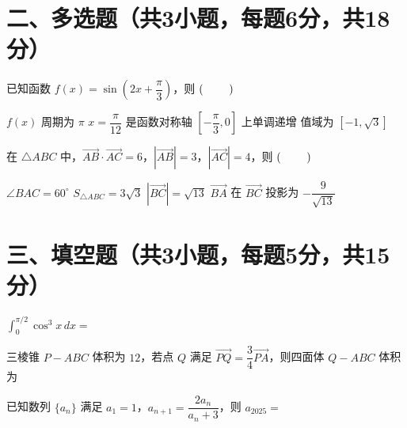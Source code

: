 \documentclass[UTF8,12pt]{exam}
\DeclarePairedDelimiter{\paren}{(}{)} %
\begin{document}
\section*{二、多选题（共3小题，每题6分，共18分）}
\begin{questions}
\question 已知函数 $f(x)=\sin\left(2x+\dfrac{\pi}{3}\right)$，则 \hfill $\paren{\ \ \ \ \ \ \ }$
\begin{checkboxes}
\choice $f(x)$ 周期为 $\pi$  
\choice $x=\dfrac{\pi}{12}$ 是函数对称轴
\choice $\left[-\dfrac{\pi}{3},0\right]$ 上单调递增
\choice 值域为 $[-1,\sqrt{3}]$
\end{checkboxes}

\question 在 $\triangle ABC$ 中，$\overrightarrow{AB}\cdot\overrightarrow{AC}=6$，$|\overrightarrow{AB}|=3$，$|\overrightarrow{AC}|=4$，则 \hfill $\paren{\ \ \ \ \ \ \ }$
\begin{checkboxes}
\choice $\angle BAC = 60^\circ$  
\choice $S_{\triangle ABC}=3\sqrt{3}$  
\choice $|\overrightarrow{BC}|=\sqrt{13}$ 
\choice $\overrightarrow{BA}$ 在 $\overrightarrow{BC}$ 投影为 $-\dfrac{9}{\sqrt{13}}$
\end{checkboxes}
\end{questions}

\section*{三、填空题（共3小题，每题5分，共15分）}
\begin{questions}
\question $\displaystyle\int_0^{\pi/2} \cos^3 x\, dx = $\underline{\hspace{2cm}} 

\question 三棱锥 $P-ABC$ 体积为 $12$，若点 $Q$ 满足 $\overrightarrow{PQ}=\dfrac{3}{4}\overrightarrow{PA}$，则四面体 $Q-ABC$ 体积为\underline{\hspace{2cm}} 

\question 已知数列 $\{a_n\}$ 满足 $a_1=1$，$a_{n+1}=\dfrac{2a_n}{a_n+3}$，则 $a_{2025}=$\underline{\hspace{2cm}} 
\end{questions}


\end{document}
